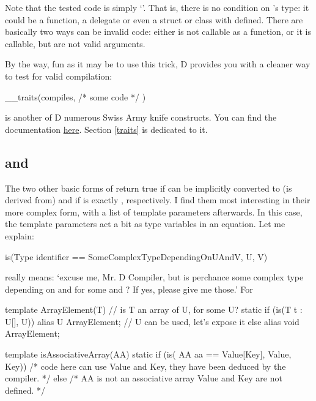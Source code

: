 Note that the tested code is simply `'. That is, there is no condition on 's type: it could be a function, a delegate or even a struct or class with  defined. There are basically two ways  can be invalid code: either  is not callable as a function, or it is callable, but  are not valid arguments.

By the way, fun as it may be to use this trick, D provides you with a cleaner way to test for valid compilation:

\begin{dcode}
__traits(compiles, { /* some code */ })
\end{dcode}

 is another of D numerous Swiss Army knife constructs. You can find the  documentation \href{http://www.d-programming-language.org/traits.html#compiles}{here}. Section \ref{traits} is dedicated to it.

\subsection{ and }
\label{istypeanothertype}

The two other basic forms of  return true if  can be implicitly converted to (is derived from)  and if  is exactly , respectively.  I find them most interesting in their more complex form, with a list of template parameters afterwards. In this case, the template parameters act a bit as type variables in an equation. Let me explain:

\begin{dcode}
is(Type identifier == SomeComplexTypeDependingOnUAndV, U, V)
\end{dcode}

really means: `excuse me, Mr. D Compiler, but is  perchance some complex type depending on  and  for some  and ? If yes, please give me those.'
For 

\begin{dcode}
template ArrayElement(T)
{
    // is T an array of U, for some U?
    static if (is(T t : U[], U)) 
        alias U ArrayElement; // U can be used, let's expose it
    else
        alias void ArrayElement;
}

template isAssociativeArray(AA)
{
    static if (is( AA aa == Value[Key], Value, Key))  
        /* code here can use Value and Key, 
           they have been deduced by the compiler. */ 
    else
        /* AA is not an associative array
          Value and Key are not defined. */
}
\end{dcode}

